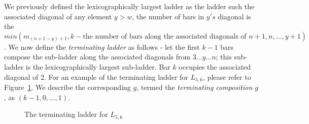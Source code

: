 We previously defined the lexicographically largest ladder as the ladder such 
the associated diagonal of any element $y>w$, the number of bars in $y's$ diagonal is the $min(m_{(n+1-y)+1}, k-\text{the number of bars along the associated diagonals of } n+1,n,\dots,y+1)$. 
We now define the \emph{terminating ladder} as follows - let the 
first $k-1$ bars compose the sub-ladder along the associated diagonals from $3 \dots y \dots n$; this sub-ladder is the 
lexicographically largest sub-ladder. Bar $k$ occupies the associated diagonal of $2$. For an example of the terminating ladder 
for $L_{5, 6}$, please refer to Figure~\ref{Fig:TerminatingLadder}. We describe the corresponding $g$, termed 
the \emph{terminating composition $g$}, as $(k-1, 0, \dots, 1)$. 
\begin{figure}[h]
  \centering 
  \caption{The terminating ladder for $L_{5,6}$}
  \label{Fig:TerminatingLadder}
\end{figure}

